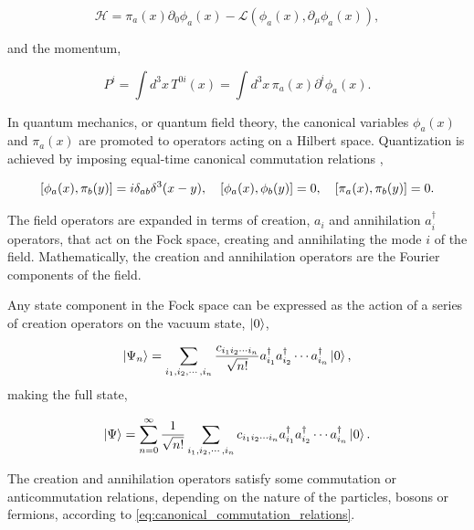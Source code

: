 \documentclass[11pt,a4paper,twoside,pdf]{article}
\numberwithin{equation}{section}
\begin{document}
\begin{equation}
    \mathcal{H} = \pi_a (x) \partial_0 \phi_a (x) - \mathcal{L}(\phi_a (x),\partial_\mu\phi_a (x)),
\end{equation}

and the momentum, 

\begin{equation}
    P^i = \int d^3x \, T^{0i}(x) = \int d^3x \, \pi_a (x) \partial^i \phi_a (x).
\end{equation}

In quantum mechanics, or quantum field theory, the canonical variables 
\( \phi_a(x) \) and \( \pi_a(x) \) are promoted to operators acting on 
a Hilbert space. Quantization is achieved by imposing equal-time canonical 
commutation relations \cite{Bjorken:100769},

\begin{equation}
    \left[ \phi_a (x), \pi_b (y) \right] = i \delta_{ab} \delta^3(x-y),
    \quad \left[ \phi_a (x), \phi_b (y) \right] = 0, \quad
    \left[ \pi_a (x), \pi_b (y) \right] = 0.
    \label{eq:canonical_commutation_relations}
\end{equation}

The field operators are expanded in terms of creation, $a_i$ and annihilation 
$a^\dagger_i$ operators, that act on the Fock space, creating and annihilating the mode 
$i$ of the field. Mathematically, the creation and annihilation operators are the 
Fourier components of the field.

Any state component in the Fock space can be expressed as the action of a series of 
creation operators on the vacuum state, $\ket{0}$,

\begin{equation}
    \ket{\Psi_n} = \sum_{i_1,i_2,\cdots,i_n} \frac{c_{i_1 i_2 \cdots i_n}}{\sqrt{n!}}
    a^\dagger_{i_1} a^\dagger_{i_2} \cdots a^\dagger_{i_n} \ket{0},
\end{equation}
making the full state, 

\begin{equation}
    \ket{\Psi} = \sum_{n=0}^{\infty} \frac{1}{\sqrt{n!}} \sum_{i_1,i_2,\cdots,i_n} 
    c_{i_1 i_2 \cdots i_n} a^\dagger_{i_1} a^\dagger_{i_2} \cdots a^\dagger_{i_n} \ket{0}.
\end{equation}

The creation and annihilation operators satisfy some commutation or anticommutation 
relations, depending on the nature of the particles, bosons or fermions, according
to \eqref{eq:canonical_commutation_relations}.
\end{document}

